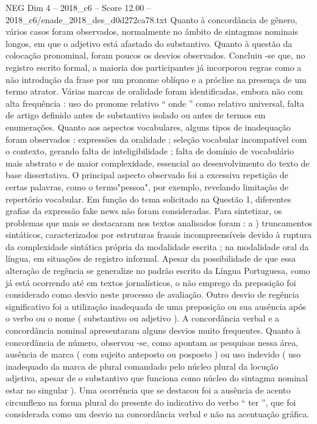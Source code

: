 \begin{textsample}{NEG Dim 4 – 2018\_c6 – Score 12.00 – 2018\_c6/enade\_2018\_des\_d0d272ca78.txt}
Quanto à concordância de gênero, vários casos foram observados, normalmente no âmbito de sintagmas nominais longos, em que o adjetivo está afastado do substantivo.
Quanto à questão da colocação pronominal, foram poucos os desvios observados.
Concluiu -se que, no registro escrito formal, a maioria dos participantes já incorporou regras como a não introdução da frase por um pronome oblíquo e a próclise na presença de um termo atrator.
Várias marcas de oralidade foram identificadas, embora não com alta frequência : uso do pronome relativo “ onde ” como relativo universal, falta de artigo definido antes de substantivo isolado ou antes de termos em enumerações.
Quanto aos aspectos vocabulares, alguns tipos de inadequação foram observados : expressões da oralidade ; seleção vocabular incompatível com o contexto, gerando falta de inteligibilidade ; falta de domínio de vocabulário mais abstrato e de maior complexidade, essencial ao desenvolvimento do texto de base dissertativa.
O principal aspecto observado foi a excessiva repetição de certas palavras, como o termo"pessoa", por exemplo, revelando limitação de repertório vocabular.
Em função do tema solicitado na Questão 1, diferentes grafias da expressão fake news não foram consideradas.
Para sintetizar, os problemas que mais se destacaram nos textos analisados foram : a ) truncamentos sintáticos, caracterizados por estruturas frasais incompreensíveis devido à ruptura da complexidade sintática própria da modalidade escrita ; na modalidade oral da língua, em situações de registro informal.
Apesar da possibilidade de que essa alteração de regência se generalize no padrão escrito da Língua Portuguesa, como já está ocorrendo até em textos jornalísticos, o não emprego da preposição foi considerado como desvio neste processo de avaliação.
Outro desvio de regência significativo foi a utilização inadequada de uma preposição ou sua ausência após o verbo ou o nome ( substantivo ou adjetivo ).
A concordância verbal e a concordância nominal apresentaram alguns desvios muito frequentes.
Quanto à concordância de número, observou -se, como apontam as pesquisas nessa área, ausência de marca ( com sujeito anteposto ou posposto ) ou uso indevido ( uso inadequado da marca de plural comandado pelo núcleo plural da locução adjetiva, apesar de o substantivo que funciona como núcleo do sintagma nominal estar no singular ).
Uma ocorrência que se destacou foi a ausência de acento circunflexo na forma plural do presente do indicativo do verbo “ ter ”, que foi considerada como um desvio na concordância verbal e não na acentuação gráfica.

\end{textsample}
